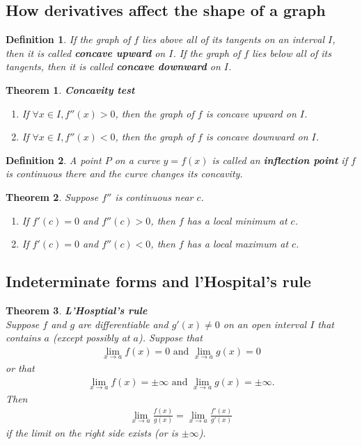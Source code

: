 \documentclass{article}
\theoremstyle{sltheorem}
\newtheorem{definition}{Definition}[section]
\newtheorem{theorem}{Theorem}[section]
\begin{document}
\subsection{How derivatives affect the shape of a graph}
\begin{definition}
    If the graph of $f$ lies above all of its tangents on an interval $I$, then it is called \textbf{concave upward} on $I$. If the graph of $f$ lies below all of its tangents, then it is called \textbf{concave downward} on $I$.
\end{definition}
\begin{theorem}
    \textbf{Concavity test}
    \begin{enumerate}
        \item If $\forall x\in I, f''(x)>0$, then the graph of $f$ is concave upward on $I$.
        \item If $\forall x\in I, f''(x)<0$, then the graph of $f$ is concave downward on $I$.
    \end{enumerate}
\end{theorem}
\begin{definition}
    A point $P$ on a curve $y=f(x)$ is called an \textbf{inflection point} if $f$ is continuous there and the curve changes its concavity.
\end{definition}
\begin{theorem}
    Suppose $f''$ is continuous near $c$.
    \begin{enumerate}
        \item If $f'(c)=0$ and $f''(c)>0$, then $f$ has a local minimum at $c$.
        \item If $f'(c)=0$ and $f''(c)<0$, then $f$ has a local maximum at $c$.
    \end{enumerate}
\end{theorem}
\subsection{Indeterminate forms and l'Hospital's rule}
\begin{theorem}
    \textbf{L'Hosptial's rule}\\
    Suppose $f$ and $g$ are differentiable and $g'(x)\not=0$ on an open interval $I$ that contains $a$ (except possibly at $a$). Suppose that
    \begin{align*}
        \lim_{x\to a}f(x)=0\text{ and } \lim_{x\to a}g(x)=0
    \end{align*}
    or that
    \begin{align*}
        \lim_{x\to a}f(x)=\pm\infty \text{ and } \lim_{x\to a}g(x) = \pm\infty.
    \end{align*}
    Then
    \begin{align*}
        \lim_{x\to a}\frac{f(x)}{g(x)}=\lim_{x\to a}\frac{f'(x)}{g'(x)}
    \end{align*}
    if the limit on the right side exists (or is $\pm\infty$).
\end{theorem}
\setcounter{subsection}{6}
\end{document}
